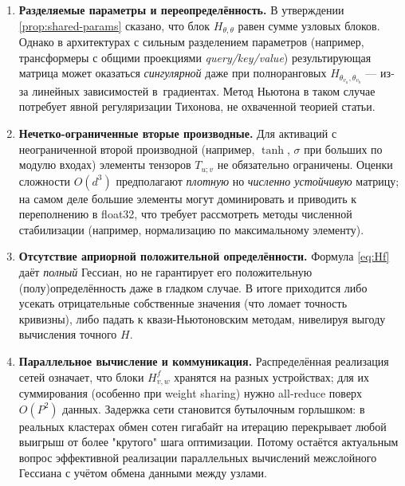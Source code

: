 \documentclass[11pt]{article}
\begin{document}
\begin{enumerate}[leftmargin=1.3cm,label=\textbf{L\,\arabic*}]
  \item\label{lim:parameter_sharing}
    \textbf{Разделяемые параметры и переопределённость.}
    В утверждении \ref{prop:shared-params} сказано, что блок
    $H_{\theta,\theta}$ равен сумме узловых блоков.
    Однако в архитектурах с сильным разделением параметров (например,
      трансформеры с общими
    проекциями \emph{query/key/value}) результирующая матрица
    может оказаться \emph{сингулярной} даже при
    полноранговых $H_{\theta_{v_a},\theta_{v_b}}$ —
    из‐за линейных зависимостей в~градиентах.
    Метод Ньютона в таком случае потребует явной
    регуляризации Тихонова, не охваченной теорией статьи.

  \item\label{lim:nonpiecewise}
    \textbf{Нечетко-ограниченные вторые производные.}
    Для активаций с неограниченной второй производной
    (например, $\tanh$, $\sigma$ при больших по модулю входах)
    элементы тензоров $T_{u;v}$ не обязательно ограничены.
    Оценки сложности $O(d^3)$ предполагают
    \emph{плотную} но \emph{численно устойчивую} матрицу;
    на самом деле большие элементы могут доминировать и
    приводить к переполнению в float32, что требует рассмотреть
    методы численной стабилизации
    (например, нормализацию по максимальному элементу).

  \item\label{lim:positive_def}
    \textbf{Отсутствие априорной положительной определённости.}
    Формула \eqref{eq:Hf}
    даёт \emph{полный} Гессиан, но не гарантирует
    его положительную (полу)определённость даже в гладком
    случае.  В итоге приходится
    либо усекать отрицательные собственные значения
    (что ломает точность кривизны),
    либо падать к квази-Ньютоновским методам,
    нивелируя выгоду вычисления точного $H$.

  \item\label{lim:parallel}
    \textbf{Параллельное вычисление и коммуникация.}
    Распределённая реализация сетей означает,
    что блоки $H^f_{v,w}$ хранятся на разных устройствах;
    для их суммирования (особенно при weight sharing) нужно
    all‐reduce поверх $O(P^2)$ данных. Задержка сети
    становится бутылочным горлышком: в реальных кластерах
    обмен сотен гигабайт на итерацию
    перекрывает любой выигрыш от более "крутого" шага оптимизации.
    Потому остаётся актуальным вопрос эффективной реализации
    параллельных вычислений межслойного Гессиана с учётом обмена 
    данными между узлами.
\end{enumerate}
\end{document}
